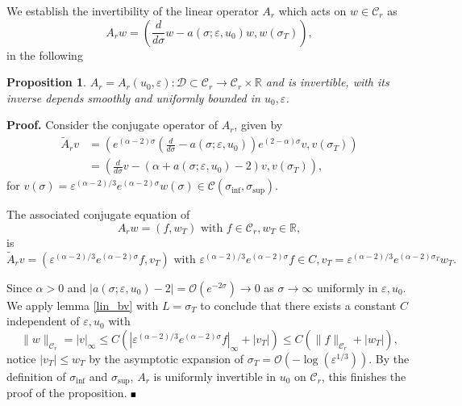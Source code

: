 \documentclass[letterpaper,11pt]{article}
\newcommand{\rmO}{\mathcal{O}}
\newcommand{\eps}{\varepsilon}
\numberwithin{equation}{section}
\theoremstyle{plain}
\newtheorem{proposition}[theorem]{Proposition}
\newenvironment{Proof}[1][.]%
 {\begin{trivlist}\item[]\textbf{Proof#1 }}%
 {\hspace*{\fill}$\rule{0.3\baselineskip}{0.35\baselineskip}$\end{trivlist}}
\begin{document}
We establish the invertibility of the linear operator $A_r$ which acts on $w \in \mathcal{C}_r$ as 
\[
A_r w = \left( \frac{d}{d\sigma}w-a(\sigma;\eps, u_0) w,  w(\sigma_T)\right),
\]
in the following
\begin{proposition}\label{inv_A_r}
$A_r=A_r(u_0,\eps) : \mathcal{D}\subset \mathcal{C}_r \to \mathcal{C}_r\times \mathbb{R}$ and is invertible, with its inverse  depends smoothly and uniformly bounded in $u_0, \eps$. 
\end{proposition}
\begin{Proof}
Consider the conjugate operator of $A_r$, given by
\begin{align*}
\tilde{A}_r v &= \left( e^{(\alpha-2)\sigma}\left(\frac{d}{d\sigma}-a(\sigma;\eps,u_0)\right)e^{(2-\alpha)\sigma} v, v(\sigma_T) \right) \\
&= \left( \frac{d}{d\sigma}v -(\alpha+a(\sigma;\eps,u_0)-2)v, v(\sigma_T) \right),
\end{align*}
for $v(\sigma)=\eps^{(\alpha-2)/3}e^{(\alpha-2)\sigma}w(\sigma) \in \mathcal{C}(\sigma_{\inf}, \sigma_{\sup})$. 

The associated conjugate equation of 
\[
A_r w = (f,w_T) \text{ with } f \in \mathcal{C}_r, w_T \in \mathbb{R},
\] is 
\[
\tilde{A}_r v = (\eps^{(\alpha-2)/3}e^{(\alpha-2)\sigma} f,v_T) \text{ with } \eps^{(\alpha-2)/3}e^{(\alpha-2)\sigma} f \in C , v_T = \eps^{(\alpha-2)/3} e^{(\alpha-2)\sigma_T}w_T.
\]
 
Since $\alpha > 0$ and $|a(\sigma;\eps,u_0) -2| = \rmO(e^{-2\sigma}) \to 0$ as $\sigma \to \infty$ uniformly in $\eps, u_0$. We apply lemma \ref{lin_bv} with $L= \sigma_T$ to conclude that there exists a constant $C$ independent of $\eps, u_0$ with 
\begin{equation}\label{linear_est:r}
\|w\|_{\mathcal{C}_r} = |v|_\infty \le C(|\eps^{(\alpha-2)/3}e^{(\alpha-2)\sigma} f |_{\infty}+|v_T|) \le C(\|f\|_{\mathcal{C}_r}+|w_T|),
\end{equation}
notice $|v_T| \le w_T$ by the asymptotic expansion of $\sigma_T  = \rmO(-\log(\eps^{1/3}))$. By the definition of $\sigma_{\inf}$ and $\sigma_{\sup}$, $A_r$ is uniformly invertible in $u_0$ on $\mathcal{C}_r$, this finishes the proof of the proposition.
\end{Proof}
\end{document}
